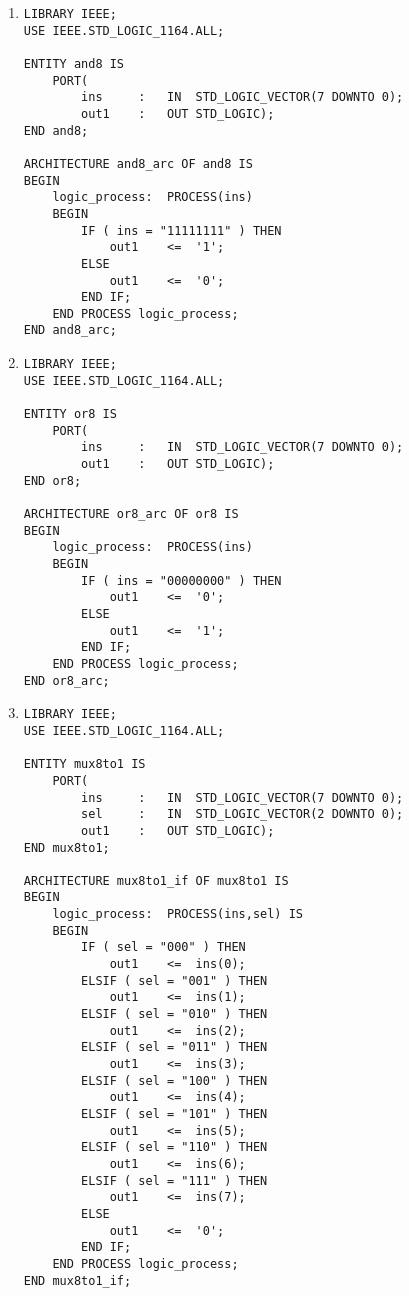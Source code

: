 \begin{enumerate}
\begin{lstlisting}
ENTITY Exercise_5_3 IS
	PORT(
		A,B		:	IN	STD_LOGIC_VECTOR(1 DOWNTO 0);
		D		:	IN	STD_LOGIC;
		E_out	:	OUT	STD_LOGIC);
END Exercise_5_3;

ARCHITECTURE Exercise_5_3_arc OF Exercise_5_3 IS
	SIGNAL Aout,Bout,Cout,Dout	:	STD_LOGIC;
BEGIN
	Aout	<=	A(1) AND A(2);
	Bout	<=	B(1) OR B(2);
	Cout	<=	B(2) AND Dout;
	Dout	<=	NOT D;
	E_out	<=	Aout OR Bout OR Cout;
END Exercise_5_3_arc;
	\end{lstlisting}
	
	\item 
	\begin{lstlisting}
LIBRARY IEEE;
USE IEEE.STD_LOGIC_1164.ALL;

ENTITY and8 IS
	PORT(
		ins		:	IN	STD_LOGIC_VECTOR(7 DOWNTO 0);
		out1	:	OUT	STD_LOGIC);
END and8;

ARCHITECTURE and8_arc OF and8 IS
BEGIN
	logic_process:	PROCESS(ins)
	BEGIN
		IF ( ins = "11111111" ) THEN
			out1	<=	'1';
		ELSE
			out1	<=	'0';
		END IF;
	END PROCESS logic_process;
END and8_arc;
	\end{lstlisting}
	
	\item
	\begin{lstlisting}
LIBRARY IEEE;
USE IEEE.STD_LOGIC_1164.ALL;

ENTITY or8 IS
	PORT(
		ins		:	IN	STD_LOGIC_VECTOR(7 DOWNTO 0);
		out1	:	OUT	STD_LOGIC);
END or8;

ARCHITECTURE or8_arc OF or8 IS
BEGIN
	logic_process:	PROCESS(ins)
	BEGIN
		IF ( ins = "00000000" ) THEN
			out1	<=	'0';
		ELSE
			out1	<=	'1';
		END IF;
	END PROCESS logic_process;
END or8_arc;
	\end{lstlisting}
	
	\item 
	\begin{lstlisting}
LIBRARY IEEE;
USE IEEE.STD_LOGIC_1164.ALL;

ENTITY mux8to1 IS
	PORT(
		ins		:	IN	STD_LOGIC_VECTOR(7 DOWNTO 0);
		sel		:	IN	STD_LOGIC_VECTOR(2 DOWNTO 0);
		out1	:	OUT	STD_LOGIC);
END mux8to1;

ARCHITECTURE mux8to1_if OF mux8to1 IS
BEGIN
	logic_process:	PROCESS(ins,sel) IS
	BEGIN
		IF ( sel = "000" ) THEN
			out1	<=	ins(0);
		ELSIF ( sel = "001" ) THEN
			out1	<=	ins(1);
		ELSIF ( sel = "010" ) THEN
			out1	<=	ins(2);
		ELSIF ( sel = "011" ) THEN
			out1	<=	ins(3);
		ELSIF ( sel = "100" ) THEN
			out1	<=	ins(4);
		ELSIF ( sel = "101" ) THEN
			out1	<=	ins(5);
		ELSIF ( sel = "110" ) THEN
			out1	<=	ins(6);
		ELSIF ( sel = "111" ) THEN
			out1	<=	ins(7);
		ELSE
			out1	<=	'0';
		END IF;			
	END PROCESS logic_process;
END mux8to1_if;


\end{lstlisting}
\end{enumerate}
